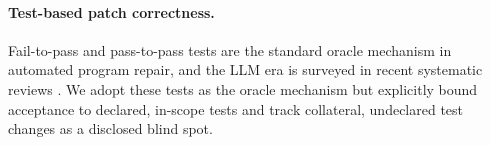 \paragraph{Test-based patch correctness.}
Fail-to-pass and pass-to-pass tests are the standard oracle mechanism in
automated program repair, and the LLM era is surveyed in recent systematic
reviews \citep{hou2024large,zhang2024systematic}. We adopt these tests as the
oracle mechanism but explicitly bound acceptance to declared, in-scope tests
and track collateral, undeclared test changes as a disclosed blind spot.
